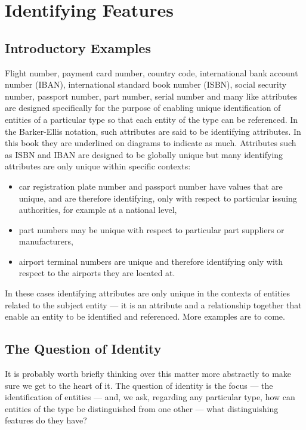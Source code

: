 \section{Identifying Features}
\label{IdentifyingFeatures}

\subsection{Introductory Examples}

\mynote 
Flight number, payment card number, country code, international bank account number (IBAN), 
international standard book number (ISBN), social security number, passport number, part number, serial number and many like attributes are designed specifically for the purpose of enabling unique identification of entities of a particular type so that each entity of the type can be referenced. 
In the Barker-Ellis notation, such attributes are said to be identifying attributes. In this book they are underlined 
on diagrams to indicate as much. 
Attributes such as ISBN and IBAN are designed to be globally unique but many identifying attributes are only unique within specific contexts:
\begin{itemize}
\item
car registration plate number and passport number have values that are unique, and are therefore identifying, only with respect to particular issuing authorities, for example at a national level,
\item part numbers may be unique with respect to particular part suppliers or manufacturers,
\item airport terminal numbers are unique and therefore identifying only with respect to the airports they are located at.
\end{itemize}
In these cases identifying attributes are only unique in the contexts of entities related to the subject entity --- it is an attribute and a relationship together that enable an entity to be identified and referenced. More examples are to come.

\subsection{The Question of Identity}
\mynote
It is probably worth briefly thinking over this matter more abstractly to make sure we get to the heart of it. The question of identity is the focus --- the identification of entities ---  and, we ask, regarding any particular type, how can entities of the type be distinguished from one other 
--- what distinguishing features do they have? 

